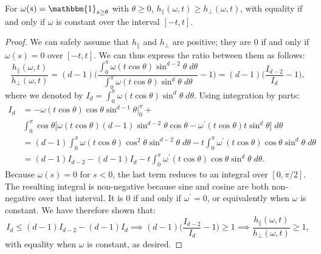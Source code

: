\begin{theorem}
    For $\omega(s) = \mathbbm{1}_{s \geq \theta}$ with $\theta \geq 0$, $h_\parallel(\omega, t) \geq h_\perp(\omega, t)$,
    with equality if and only if $\omega$ is constant over the interval $[-t, t]$.
\end{theorem}
\begin{proof}
    We can safely assume that $h_\parallel$ and $h_\perp$ are positive; they are $0$ if and only if
    $\omega(s) = 0$ over $[-t, t]$. We can thus express the ratio between them as follows:
    \begin{equation*}
        \frac{h_\parallel(\omega, t)}{h_\perp(\omega, t)} = (d - 1)
            \Bigg( \frac{\int_0^\pi \omega(t\cos \theta) \sin^{d-2}\theta \;d\theta }{\int_0^\pi \omega(t \cos \theta) \sin^d\theta \; d\theta} - 1\Bigg) = (d - 1) \Big( \frac{I_{d-2}}{I_d} -1 \Big),
    \end{equation*}
    where we denoted by $I_d = \int_0^\pi \omega(t \cos \theta) \sin^d \theta \; d\theta$.
    Using integration by parts:
    \begin{align*}
        I_d &= - \omega(t \cos \theta) \cos \theta \sin^{d-1}\theta \Big|_0^\pi + \\
        &\int_0^\pi \cos \theta \Big[ \omega(t \cos \theta)(d-1)\sin^{d-2}\theta \cos \theta -
        \omega^\prime(t \cos \theta) t \sin^d \theta \Big] \; d\theta \\
        &= (d - 1) \int_0^\pi \omega(t \cos \theta) \cos^2 \theta \sin^{d-2}\theta \; d\theta -
        t \int_0^\pi \omega^\prime(t \cos \theta) \cos \theta \sin^d \theta \; d\theta \\
        &= (d - 1) I_{d-2} - (d - 1) I_d -
        t \int_0^\pi \omega^\prime(t \cos \theta) \cos \theta \sin^d \theta \; d\theta.
    \end{align*}
    Because $\omega(s) = 0$ for $s < 0$, the last term reduces to an integral over $[0, \pi/2]$.
    The resulting integral is non-negative because sine and cosine are both non-negative over that interval.
    It is $0$ if and only if $\omega^\prime = 0$, or equivalently when $\omega$ is constant.
    We have therefore shown that:
    \begin{equation*}
        I_d \leq (d - 1) I_{d-2} - (d-1) I_d \implies (d - 1) \Big( \frac{I_{d-2}}{I_d} - 1 \Big) \geq 1
        \implies \frac{h_\parallel(\omega, t)}{h_\perp(\omega, t)} \geq 1,
    \end{equation*}
    with equality when $\omega$ is constant, as desired.
\end{proof}

